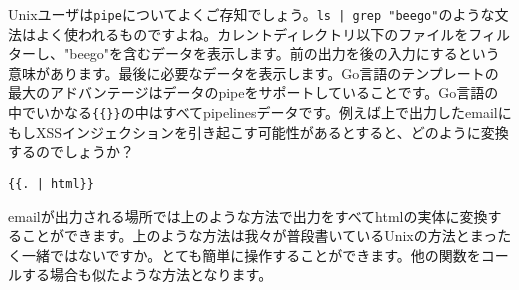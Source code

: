 Unixユーザは\texttt{pipe}についてよくご存知でしょう。\texttt{ls | grep "beego"}のような文法はよく使われるものですよね。カレントディレクトリ以下のファイルをフィルターし、"beego"を含むデータを表示します。前の出力を後の入力にするという意味があります。最後に必要なデータを表示します。Go言語のテンプレートの最大のアドバンテージはデータのpipeをサポートしていることです。Go言語の中でいかなる\texttt{\{\{\}\}}の中はすべてpipelinesデータです。例えば上で出力したemailにもしXSSインジェクションを引き起こす可能性があるとすると、どのように変換するのでしょうか？

\begin{lstlisting}[numbers=none]
{{. | html}}
\end{lstlisting}

emailが出力される場所では上のような方法で出力をすべてhtmlの実体に変換することができます。上のような方法は我々が普段書いているUnixの方法とまったく一緒ではないですか。とても簡単に操作することができます。他の関数をコールする場合も似たような方法となります。

